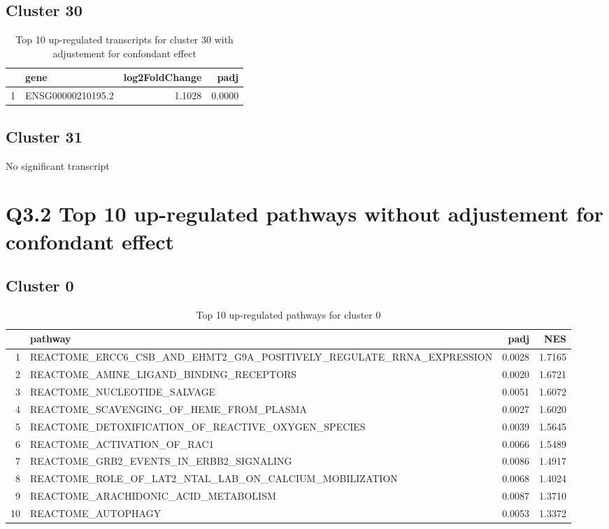 \documentclass{article}
\begin{document}
\subsection{Cluster 30 }
\begin{table}[H]
\centering
\begin{tabularx}{\textwidth}{rlrr}
  \hline
 & gene & log2FoldChange & padj \\ 
  \hline
1 & ENSG00000210195.2 & 1.1028 & 0.0000 \\ 
   \hline
\end{tabularx}
\caption{Top 10 up-regulated transcripts for cluster 30 with adjustement for confondant effect} 
\label{tab:q3_1_conf_30}
\end{table}
\subsection{Cluster 31 }
No significant transcript
\section{Q3.2 Top 10 up-regulated pathways without adjustement for confondant effect}
\subsection{Cluster 0 }
\begin{table}[H]
\centering
\begin{tabularx}{\textwidth}{rlrr}
  \hline
 & pathway & padj & NES \\ 
  \hline
1 & REACTOME\_ERCC6\_CSB\_AND\_EHMT2\_G9A\_POSITIVELY\_REGULATE\_RRNA\_EXPRESSION & 0.0028 & 1.7165 \\ 
  2 & REACTOME\_AMINE\_LIGAND\_BINDING\_RECEPTORS & 0.0020 & 1.6721 \\ 
  3 & REACTOME\_NUCLEOTIDE\_SALVAGE & 0.0051 & 1.6072 \\ 
  4 & REACTOME\_SCAVENGING\_OF\_HEME\_FROM\_PLASMA & 0.0027 & 1.6020 \\ 
  5 & REACTOME\_DETOXIFICATION\_OF\_REACTIVE\_OXYGEN\_SPECIES & 0.0039 & 1.5645 \\ 
  6 & REACTOME\_ACTIVATION\_OF\_RAC1 & 0.0066 & 1.5489 \\ 
  7 & REACTOME\_GRB2\_EVENTS\_IN\_ERBB2\_SIGNALING & 0.0086 & 1.4917 \\ 
  8 & REACTOME\_ROLE\_OF\_LAT2\_NTAL\_LAB\_ON\_CALCIUM\_MOBILIZATION & 0.0068 & 1.4024 \\ 
  9 & REACTOME\_ARACHIDONIC\_ACID\_METABOLISM & 0.0087 & 1.3710 \\ 
  10 & REACTOME\_AUTOPHAGY & 0.0053 & 1.3372 \\ 
   \hline
\end{tabularx}
\caption{Top 10 up-regulated pathways for cluster 0} 
\label{tab:q3_2_0}
\end{table}
\end{document}
